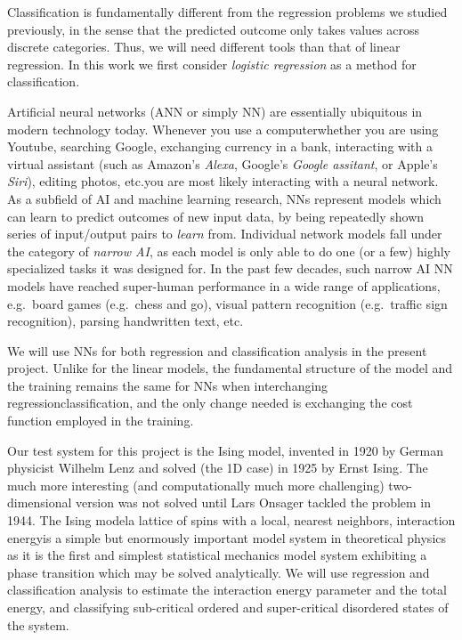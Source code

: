 \documentclass[a4paper, twocolumn]{article}
\begin{document}
Classification is fundamentally different from the regression problems we studied previously, in the sense that the predicted outcome only takes values across discrete categories.  Thus, we will need different tools than that of linear regression. In this work we first consider \textit{logistic regression} as a method for classification. 

Artificial neural networks (ANN or simply NN) are essentially ubiquitous in modern technology today. Whenever you use a computer\textemdash whether you are using Youtube, searching Google, exchanging currency in a bank, interacting with a virtual assistant (such as Amazon's \textit{Alexa}, Google's \textit{Google assitant}, or Apple's \textit{Siri}), editing photos, etc.\textemdash you are most likely interacting with a neural network. As a subfield of AI and machine learning research, NNs represent models which can learn to predict outcomes of new input data, by being repeatedly shown series of input/output pairs to \textit{learn} from. Individual network models fall under the category of \textit{narrow AI}, as each model is only able to do one (or a few) highly specialized tasks it was designed for. In the past few decades, such narrow AI NN models have reached super-human performance in a wide range of applications, e.g.\ board games (e.g.\ chess and go), visual pattern recognition (e.g.\ traffic sign recognition), parsing handwritten text, etc.

We will use NNs for both regression and classification analysis in the present project. Unlike for the linear models, the fundamental structure of the model and the training remains the same for NNs when interchanging regression\ce{<=>}classification, and the only change needed is exchanging the cost function employed in the training. 

Our test system for this project is the Ising model, invented in 1920 by German physicist Wilhelm Lenz and solved (the 1D case) in 1925 by Ernst Ising\autocite{Ising1925}. The much more interesting (and computationally much more challenging) two-dimensional version was not solved until Lars Onsager tackled the problem in 1944\autocite{onsager1944crystal}. The Ising model\textemdash a lattice of spins with a local, nearest neighbors, interaction energy\textemdash is a simple but enormously important model system in theoretical physics as it is the first and simplest statistical mechanics model system exhibiting a phase transition which may be solved analytically\autocite{mccoy2012importance}. We will use regression and classification analysis to estimate the interaction energy parameter and the total energy, and classifying sub-critical ordered and super-critical disordered states of the system.
\end{document}
